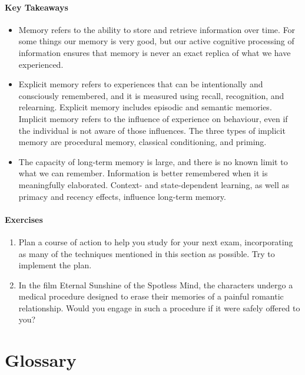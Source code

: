 \documentclass[
]{krantz}
\providecommand{\tightlist}{%
  \setlength{\itemsep}{0pt}\setlength{\parskip}{0pt}}
\begin{document}
\paragraph*{Key Takeaways}\label{key-takeaways-4}

\begin{itemize}
\tightlist
\item
  Memory refers to the ability to store and retrieve information over time. For some things our memory is very good, but our active cognitive processing of information ensures that memory is never an exact replica of what we have experienced.
\item
  Explicit memory refers to experiences that can be intentionally and consciously remembered, and it is measured using recall, recognition, and relearning. Explicit memory includes episodic and semantic memories. Implicit memory refers to the influence of experience on behaviour, even if the individual is not aware of those influences. The three types of implicit memory are procedural memory, classical conditioning, and priming.
\item
  The capacity of long-term memory is large, and there is no known limit to what we can remember. Information is better remembered when it is meaningfully elaborated. Context- and state-dependent learning, as well as primacy and recency effects, influence long-term memory.
\end{itemize}

\paragraph*{Exercises}\label{exercises-4}

\begin{enumerate}
\def\labelenumi{\arabic{enumi}.}
\tightlist
\item
  Plan a course of action to help you study for your next exam, incorporating as many of the techniques mentioned in this section as possible. Try to implement the plan.
\item
  In the film Eternal Sunshine of the Spotless Mind, the characters undergo a medical procedure designed to erase their memories of a painful romantic relationship. Would you engage in such a procedure if it were safely offered to you?
\end{enumerate}

\section{Glossary}\label{glossary-4}
\end{document}
